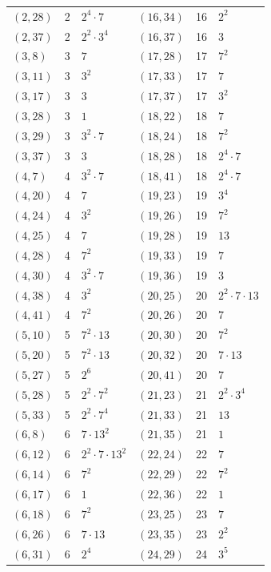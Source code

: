 \documentclass[11pt]{article}
\begin{document}
\begin{longtable}{@{}lrl@{\qquad}lrl@{}}
$(2,28)$ & 2 & $2^{4}\cdot 7$ & $(16,34)$ & 16 & $2^{2}$\\
$(2,37)$ & 2 & $2^{2}\cdot 3^{4}$ & $(16,37)$ & 16 & $3$\\
$(3,8)$ & 3 & $7$ & $(17,28)$ & 17 & $7^{2}$\\
$(3,11)$ & 3 & $3^{2}$ & $(17,33)$ & 17 & $7$\\
$(3,17)$ & 3 & $3$ & $(17,37)$ & 17 & $3^{2}$\\
$(3,28)$ & 3 & $1$ & $(18,22)$ & 18 & $7$\\
$(3,29)$ & 3 & $3^{2}\cdot 7$ & $(18,24)$ & 18 & $7^{2}$\\
$(3,37)$ & 3 & $3$ & $(18,28)$ & 18 & $2^{4}\cdot 7$\\
$(4,7)$ & 4 & $3^{2}\cdot 7$ & $(18,41)$ & 18 & $2^{4}\cdot 7$\\
$(4,20)$ & 4 & $7$ & $(19,23)$ & 19 & $3^{4}$\\
$(4,24)$ & 4 & $3^{2}$ & $(19,26)$ & 19 & $7^{2}$\\
$(4,25)$ & 4 & $7$ & $(19,28)$ & 19 & $13$\\
$(4,28)$ & 4 & $7^{2}$ & $(19,33)$ & 19 & $7$\\
$(4,30)$ & 4 & $3^{2}\cdot 7$ & $(19,36)$ & 19 & $3$\\
$(4,38)$ & 4 & $3^{2}$ & $(20,25)$ & 20 & $2^{2}\cdot 7\cdot 13$\\
$(4,41)$ & 4 & $7^{2}$ & $(20,26)$ & 20 & $7$\\
$(5,10)$ & 5 & $7^{2}\cdot 13$ & $(20,30)$ & 20 & $7^{2}$\\
$(5,20)$ & 5 & $7^{2}\cdot 13$ & $(20,32)$ & 20 & $7\cdot 13$\\
$(5,27)$ & 5 & $2^{6}$ & $(20,41)$ & 20 & $7$\\
$(5,28)$ & 5 & $2^{2}\cdot 7^{2}$ & $(21,23)$ & 21 & $2^{2}\cdot 3^{4}$\\
$(5,33)$ & 5 & $2^{2}\cdot 7^{4}$ & $(21,33)$ & 21 & $13$\\
$(6,8)$ & 6 & $7\cdot 13^{2}$ & $(21,35)$ & 21 & $1$\\
$(6,12)$ & 6 & $2^{2}\cdot 7\cdot 13^{2}$ & $(22,24)$ & 22 & $7$\\
$(6,14)$ & 6 & $7^{2}$ & $(22,29)$ & 22 & $7^{2}$\\
$(6,17)$ & 6 & $1$ & $(22,36)$ & 22 & $1$\\
$(6,18)$ & 6 & $7^{2}$ & $(23,25)$ & 23 & $7$\\
$(6,26)$ & 6 & $7\cdot 13$ & $(23,35)$ & 23 & $2^{2}$\\
$(6,31)$ & 6 & $2^{4}$ & $(24,29)$ & 24 & $3^{5}$\\

\end{longtable}
\end{document}
